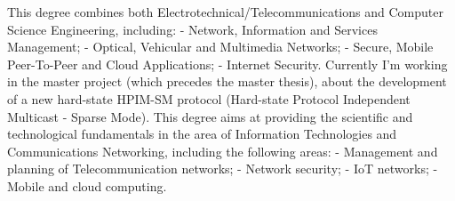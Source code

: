 \documentclass[
	a4paper,
]{fortysecondscv}
\begin{document}
\makefrontsidebar

\begin{cvtable}[3]
\end{cvtable}

\begin{cvtable}[1.5]
		{This degree combines both Electrotechnical/Telecommunications and Computer Science Engineering, including:\newline
		 - Network, Information and Services Management;\newline
		 - Optical, Vehicular and Multimedia Networks;\newline
		 - Secure, Mobile Peer-To-Peer and Cloud Applications;\newline
		 - Internet Security.\newline
		 Currently I'm working in the master project (which precedes the master thesis), about the development of a new hard-state HPIM-SM protocol (Hard-state Protocol Independent Multicast - Sparse Mode).}
		{This degree aims at providing the scientific and technological fundamentals in the area of Information Technologies and Communications Networking, including the following areas:\newline
		 - Management and planning of Telecommunication networks;\newline
		 - Network security;\newline
		 - IoT networks;\newline
		 - Mobile and cloud computing.}
\end{cvtable}

\begin{cvtable}
\end{cvtable}
\end{document}
